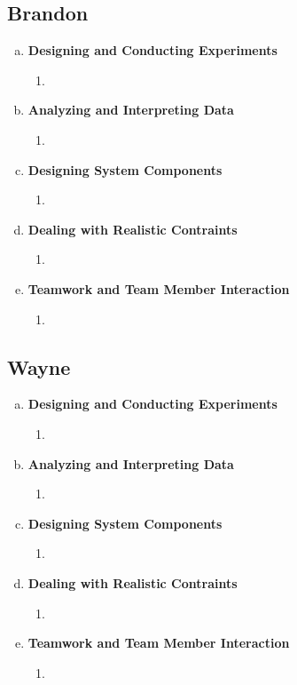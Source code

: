\documentclass[11pt]{article}   %
\begin{document}
\subsection*{Brandon}

\begin{enumerate} [a)]
\item  {\bf Designing and Conducting Experiments}
\begin{enumerate} [$\cdot$]
\item 
\end{enumerate}
\item  {\bf Analyzing and Interpreting Data}
\begin{enumerate} [$\cdot$]
\item  
\end{enumerate}
\item {\bf Designing System Components}
\begin{enumerate} [$\cdot$]
\item 
\end{enumerate}
\item {\bf Dealing with Realistic Contraints}
\begin{enumerate} [$\cdot$]
\item 
\end{enumerate}
\item  {\bf Teamwork and Team Member Interaction}
\begin{enumerate} [$\cdot$]
\item 
\end{enumerate}
\end{enumerate}

\subsection*{Wayne}

\begin{enumerate} [a)]
\item  {\bf Designing and Conducting Experiments}
\begin{enumerate} [$\cdot$]
\item 
\end{enumerate}
\item  {\bf Analyzing and Interpreting Data}
\begin{enumerate} [$\cdot$]
\item  
\end{enumerate}
\item {\bf Designing System Components}
\begin{enumerate} [$\cdot$]
\item 
\end{enumerate}
\item {\bf Dealing with Realistic Contraints}
\begin{enumerate} [$\cdot$]
\item 
\end{enumerate}
\item  {\bf Teamwork and Team Member Interaction}
\begin{enumerate} [$\cdot$]
\item 
\end{enumerate}
\end{enumerate}
\end{document}
